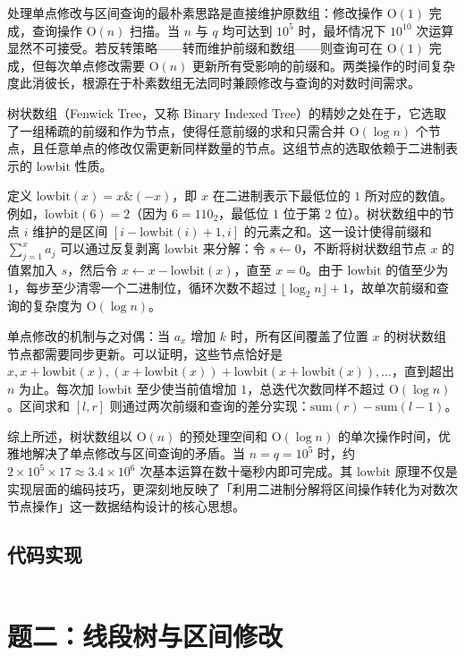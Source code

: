 \documentclass[12pt, a4paper]{academics}
\begin{document}
处理单点修改与区间查询的最朴素思路是直接维护原数组：修改操作 $\mathrm{O}(1)$ 完成，查询操作 $\mathrm{O}(n)$ 扫描。当 $n$ 与 $q$ 均可达到 $10^5$ 时，最坏情况下 $10^{10}$ 次运算显然不可接受。若反转策略——转而维护前缀和数组——则查询可在 $\mathrm{O}(1)$ 完成，但每次单点修改需要 $\mathrm{O}(n)$ 更新所有受影响的前缀和。两类操作的时间复杂度此消彼长，根源在于朴素数组无法同时兼顾修改与查询的对数时间需求。

树状数组（Fenwick Tree，又称 Binary Indexed Tree）的精妙之处在于，它选取了一组稀疏的前缀和作为节点，使得任意前缀的求和只需合并 $\mathrm{O}(\log n)$ 个节点，且任意单点的修改仅需更新同样数量的节点。这组节点的选取依赖于二进制表示的 $\mathrm{lowbit}$ 性质。

定义 $\mathrm{lowbit}(x) = x \mathbin{\&} (-x)$，即 $x$ 在二进制表示下最低位的 $1$ 所对应的数值。例如，$\mathrm{lowbit}(6) = 2$（因为 $6 = 110_2$，最低位 $1$ 位于第 $2$ 位）。树状数组中的节点 $i$ 维护的是区间 $[i - \mathrm{lowbit}(i) + 1, i]$ 的元素之和。这一设计使得前缀和 $\sum_{j=1}^{x} a_j$ 可以通过反复剥离 $\mathrm{lowbit}$ 来分解：令 $s \gets 0$，不断将树状数组节点 $x$ 的值累加入 $s$，然后令 $x \gets x - \mathrm{lowbit}(x)$，直至 $x = 0$。由于 $\mathrm{lowbit}$ 的值至少为 $1$，每步至少清零一个二进制位，循环次数不超过 $\lfloor\log_2 n\rfloor + 1$，故单次前缀和查询的复杂度为 $\mathrm{O}(\log n)$。

单点修改的机制与之对偶：当 $a_x$ 增加 $k$ 时，所有区间覆盖了位置 $x$ 的树状数组节点都需要同步更新。可以证明，这些节点恰好是 $x, x + \mathrm{lowbit}(x), (x + \mathrm{lowbit}(x)) + \mathrm{lowbit}(x + \mathrm{lowbit}(x)), \dots$，直到超出 $n$ 为止。每次加 $\mathrm{lowbit}$ 至少使当前值增加 $1$，总迭代次数同样不超过 $\mathrm{O}(\log n)$。区间求和 $[l, r]$ 则通过两次前缀和查询的差分实现：$\mathrm{sum}(r) - \mathrm{sum}(l - 1)$。

综上所述，树状数组以 $\mathrm{O}(n)$ 的预处理空间和 $\mathrm{O}(\log n)$ 的单次操作时间，优雅地解决了单点修改与区间查询的矛盾。当 $n = q = 10^5$ 时，约 $2 \times 10^5 \times 17 \approx 3.4 \times 10^6$ 次基本运算在数十毫秒内即可完成。其 $\mathrm{lowbit}$ 原理不仅是实现层面的编码技巧，更深刻地反映了「利用二进制分解将区间操作转化为对数次节点操作」这一数据结构设计的核心思想。

\subsection{代码实现}

\inputminted{c++}{../src/p1_fenwick.cpp}

\section{题二：线段树与区间修改}
\end{document}
